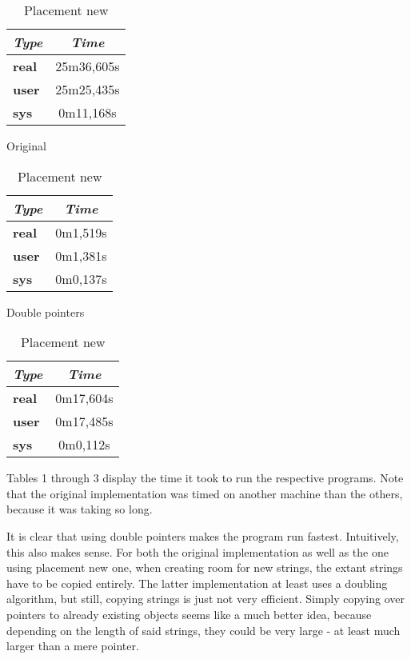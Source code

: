 \begin{table}[H]
\parbox{0.33\linewidth}
{
\centering
\begin{tabular}{l|c}
\textit{\textbf{Type}} & \textit{\textbf{Time}} \\ \hline
\textbf{real}          & 25m36,605s             \\
\textbf{user}          & 25m25,435s             \\
\textbf{sys}           & 0m11,168s              \\ \hline
\end{tabular}
\caption{Original}
}
\parbox{0.33\linewidth}
{
\centering
\begin{tabular}{l|c}
\textit{\textbf{Type}} & \textit{\textbf{Time}} \\ \hline
\textbf{real}          & 0m1,519s               \\
\textbf{user}          & 0m1,381s               \\
\textbf{sys}           & 0m0,137s               \\ \hline
\end{tabular}
\caption{Double pointers}
}
\parbox{0.33\linewidth}
{
\centering
\begin{tabular}{l|c}
\textit{\textbf{Type}} & \textit{\textbf{Time}} \\ \hline
\textbf{real}          & 0m17,604s              \\
\textbf{user}          & 0m17,485s              \\
\textbf{sys}           & 0m0,112s               \\ \hline
\end{tabular}
\caption{Placement new}
}
\end{table}

Tables 1 through 3 display the time it took to run the respective programs. Note that the original implementation was timed on another machine than the others, because it was taking so long.

It is clear that using double pointers makes the program run fastest. Intuitively, this also makes sense. For both the original implementation as well as the one using placement new one, when creating room for new strings, the extant strings have to be copied entirely. The latter implementation at least uses a doubling algorithm, but still, copying strings is just not very efficient. Simply copying over pointers to already existing objects seems like a much better idea, because depending on the length of said strings, they could be very large - at least much larger than a mere pointer.
